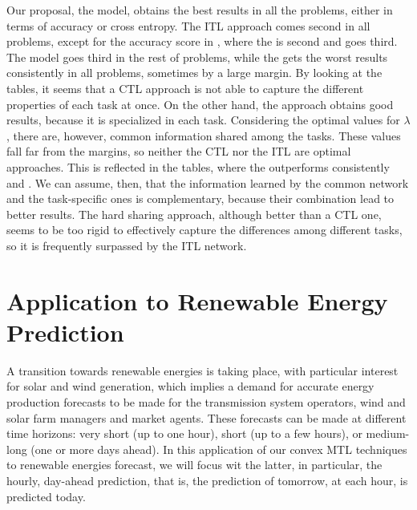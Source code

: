 Our proposal, the  model, obtains the best results in all the problems, either in terms of accuracy or cross entropy.
The ITL approach comes second in all problems, except for the accuracy score in , where the  is second and  goes third.
The  model goes third in the rest of problems, while the  gets the worst results consistently in all problems, sometimes by a large margin.
%
By looking at the tables, it seems that a CTL approach is not able to capture the different properties of each task at once. On the other hand, the  approach obtains good results, because it is specialized in each task.
Considering the optimal values for $\lambda$, there are, however, common information shared among the tasks. These values fall far from the margins, so neither the CTL nor the ITL are optimal approaches. This is reflected in the tables, where the  outperforms consistently  and . We can assume, then, that the information learned by the common network and the task-specific ones is complementary, because their combination lead to better results.
%
The hard sharing approach, although better than a CTL one, seems to be too rigid to effectively capture the differences among different tasks, so it is frequently surpassed by the ITL network.







\section{Application to Renewable Energy Prediction}\label{sec:convexmlt_renewable}

A transition towards renewable energies is taking place, with particular interest for solar and wind generation, which implies a demand for accurate energy production forecasts to be made for the transmission system operators, wind and solar farm managers and market agents. These forecasts can be made at different time horizons: very short (up to one hour), short (up to a few hours), or medium-long (one or more days ahead).
In this application of our convex MTL techniques to renewable energies forecast, we will focus wit the latter, in particular, the hourly, day-ahead prediction, that is, the prediction of tomorrow, at each hour, is predicted today.


